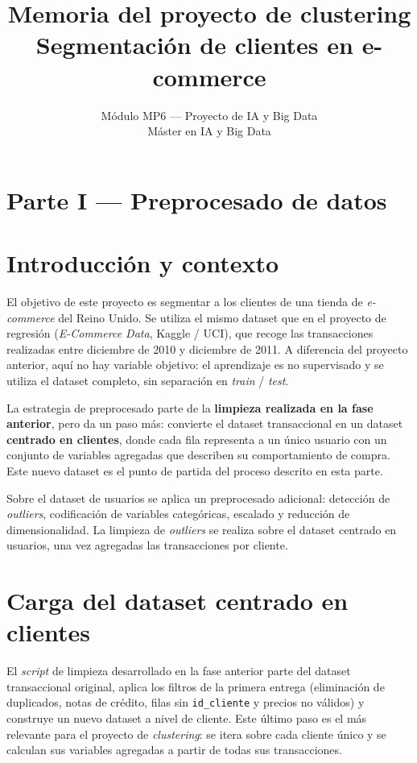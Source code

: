 \documentclass[11pt,a4paper]{article}
\title{Memoria del proyecto de clustering \\
       \large Segmentación de clientes en e-commerce}
\author{Módulo MP6 — Proyecto de IA y Big Data \\
        Máster en IA y Big Data}
\date{}
\begin{document}
\maketitle
\tableofcontents
\newpage

\section*{Parte I — Preprocesado de datos}

\section{Introducción y contexto}

El objetivo de este proyecto es segmentar a los clientes de una tienda de \textit{e-commerce} del Reino Unido. Se utiliza el mismo dataset que en el proyecto de regresión (\textit{E-Commerce Data}, Kaggle / UCI), que recoge las transacciones realizadas entre diciembre de 2010 y diciembre de 2011. A diferencia del proyecto anterior, aquí no hay variable objetivo: el aprendizaje es no supervisado y se utiliza el dataset completo, sin separación en \textit{train} / \textit{test}.

La estrategia de preprocesado parte de la \textbf{limpieza realizada en la fase anterior}, pero da un paso más: convierte el dataset transaccional en un dataset \textbf{centrado en clientes}, donde cada fila representa a un único usuario con un conjunto de variables agregadas que describen su comportamiento de compra. Este nuevo dataset es el punto de partida del proceso descrito en esta parte.

Sobre el dataset de usuarios se aplica un preprocesado adicional: detección de \textit{outliers}, codificación de variables categóricas, escalado y reducción de dimensionalidad. La limpieza de \textit{outliers} se realiza sobre el dataset centrado en usuarios, una vez agregadas las transacciones por cliente.

\section{Carga del dataset centrado en clientes}

El \textit{script} de limpieza desarrollado en la fase anterior parte del dataset transaccional original, aplica los filtros de la primera entrega (eliminación de duplicados, notas de crédito, filas sin \texttt{id\_cliente} y precios no válidos) y construye un nuevo dataset a nivel de cliente. Este último paso es el más relevante para el proyecto de \textit{clustering}: se itera sobre cada cliente único y se calculan sus variables agregadas a partir de todas sus transacciones.
\end{document}
